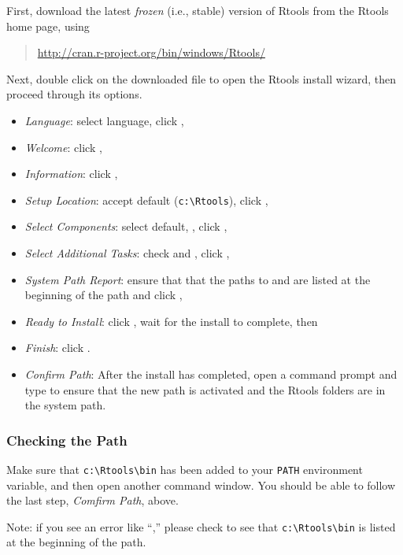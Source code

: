 First, download the latest \emph{frozen} (i.e., stable) version of
Rtools from the Rtools home page, using
%
\begin{quote}
\url{http://cran.r-project.org/bin/windows/Rtools/}
\end{quote}
%
Next, double click on the downloaded file to open the Rtools
install wizard, then proceed through its options.
\begin{itemize}
\item \emph{Language}: select language, click ,
\item \emph{Welcome}: click ,
\item \emph{Information}: click ,
\item \emph{Setup Location}: accept default (\Verb|c:\Rtools|), click ,
\item \emph{Select Components}: select default, , click ,
\item \emph{Select Additional Tasks}: check  and , click ,
\item \emph{System Path Report}: ensure that that the paths to  and  are listed at the beginning of the path and click ,
\item \emph{Ready to Install}: click , wait for the
  install to complete, then
\item \emph{Finish}: click .
\item \emph{Confirm Path}: After the install has completed, open a command prompt and type  to ensure that the new path is activated and the Rtools folders are in the system path.
\end{itemize}

\subsubsection{Checking the Path}

Make sure that \Verb|c:\Rtools\bin| has been added to your \Verb|PATH|
environment variable, and then open another command window.  You
should be able to follow the last step, \emph{Comfirm Path}, above.

Note: if you see an error like ``,'' please check to see that \Verb|c:\Rtools\bin| is
listed at the beginning of the path.

